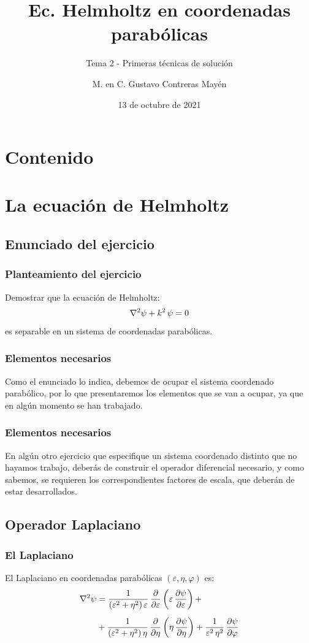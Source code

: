 \documentclass[12pt]{beamer}
\date{13 de octubre de 2021}
\title{\large{Ec. Helmholtz en coordenadas parabólicas}}
\subtitle{Tema 2 - Primeras técnicas de solución}
\author{M. en C. Gustavo Contreras Mayén}
\begin{document}
\maketitle
\fontsize{14}{14}\selectfont
{}

\section*{Contenido}

\section{La ecuación de Helmholtz}
\subsection{Enunciado del ejercicio}

\begin{frame}
\frametitle{Planteamiento del ejercicio}
Demostrar que la ecuación de Helmholtz:
\begin{align}
\laplacian{\psi} + k^{2} \, \psi = 0
\label{eq:ecuacion_Helmholtz}
\end{align}
es separable en un sistema de coordenadas parabólicas.
\end{frame}
\begin{frame}
\frametitle{Elementos necesarios}
Como el enunciado lo indica, debemos de ocupar el sistema coordenado parabólico, \pause por lo que presentaremos los elementos que se van a ocupar, ya que en algún momento se han trabajado.
\end{frame}
\begin{frame}
\frametitle{Elementos necesarios}
En algún otro ejercicio que especifique un sistema coordenado distinto que no hayamos trabajo, deberás de construir el operador diferencial necesario, y como sabemos, se requieren los correspondientes factores de escala, que deberán de estar desarrollados.
\end{frame}

\subsection{Operador Laplaciano}

\begin{frame}
\frametitle{El Laplaciano}
El Laplaciano en coordenadas parabólicas $(\varepsilon, \eta, \varphi)$ es:
\begin{align*}
\laplacian{\psi} &= \dfrac{1}{(\varepsilon^{2} + \eta^{2}) \, \varepsilon} \, \pdv{\varepsilon} \left( \varepsilon \, \pdv{\psi}{\varepsilon} \right) + \\[0.5em]
&+ \dfrac{1}{(\varepsilon^{2} + \eta^{2}) \, \eta} \, \pdv{\eta} \left( \eta \, \pdv{\psi}{\eta} \right) + \dfrac{1}{\varepsilon^{2} \, \eta^{2}} \, \pdv{\psi}{\varphi}
\end{align*}
\end{frame}
\end{document}
